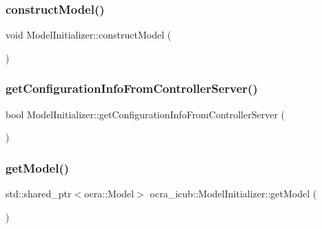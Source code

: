 \hypertarget{classocra__icub_1_1ModelInitializer_a90747ff9773627f37ca9453491377b2c}{}\label{classocra__icub_1_1ModelInitializer_a90747ff9773627f37ca9453491377b2c} 
\subsubsection{\texorpdfstring{construct\+Model()}{constructModel()}}
{\footnotesize\ttfamily void Model\+Initializer\+::construct\+Model (\begin{DoxyParamCaption}{ }\end{DoxyParamCaption})\hspace{0.3cm}{\ttfamily [private]}}

\hypertarget{classocra__icub_1_1ModelInitializer_abb762b28a1e7b57103f609c4fab4e94e}{}\label{classocra__icub_1_1ModelInitializer_abb762b28a1e7b57103f609c4fab4e94e} 
\subsubsection{\texorpdfstring{get\+Configuration\+Info\+From\+Controller\+Server()}{getConfigurationInfoFromControllerServer()}}
{\footnotesize\ttfamily bool Model\+Initializer\+::get\+Configuration\+Info\+From\+Controller\+Server (\begin{DoxyParamCaption}{ }\end{DoxyParamCaption})\hspace{0.3cm}{\ttfamily [private]}}

\hypertarget{classocra__icub_1_1ModelInitializer_aa8fbe9e7f20a2b4a29b6fce403c500c8}{}\label{classocra__icub_1_1ModelInitializer_aa8fbe9e7f20a2b4a29b6fce403c500c8} 
\subsubsection{\texorpdfstring{get\+Model()}{getModel()}}
{\footnotesize\ttfamily std\+::shared\+\_\+ptr$<$ocra\+::\+Model$>$ ocra\+\_\+icub\+::\+Model\+Initializer\+::get\+Model (\begin{DoxyParamCaption}{ }\end{DoxyParamCaption})\hspace{0.3cm}{\ttfamily [inline]}}

